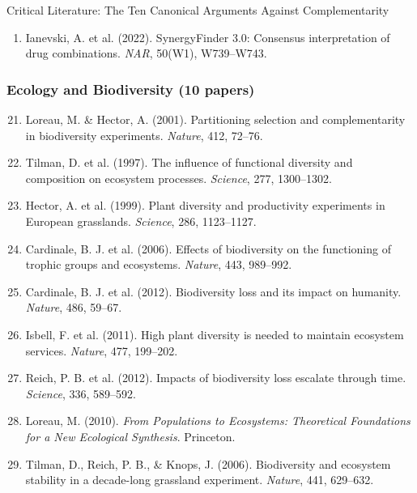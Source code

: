 \begin{chapter}{Critical Literature: The Ten Canonical Arguments Against Complementarity}
\begin{enumerate}
    \item Ianevski, A. et al. (2022). SynergyFinder 3.0: Consensus interpretation of drug combinations. \textit{NAR}, 50(W1), W739--W743.
\end{enumerate}

\subsubsection{Ecology and Biodiversity (10 papers)}

\begin{enumerate}
    \setcounter{enumi}{20}
    \item Loreau, M. \& Hector, A. (2001). Partitioning selection and complementarity in biodiversity experiments. \textit{Nature}, 412, 72--76.

    \item Tilman, D. et al. (1997). The influence of functional diversity and composition on ecosystem processes. \textit{Science}, 277, 1300--1302.

    \item Hector, A. et al. (1999). Plant diversity and productivity experiments in European grasslands. \textit{Science}, 286, 1123--1127.

    \item Cardinale, B. J. et al. (2006). Effects of biodiversity on the functioning of trophic groups and ecosystems. \textit{Nature}, 443, 989--992.

    \item Cardinale, B. J. et al. (2012). Biodiversity loss and its impact on humanity. \textit{Nature}, 486, 59--67.

    \item Isbell, F. et al. (2011). High plant diversity is needed to maintain ecosystem services. \textit{Nature}, 477, 199--202.

    \item Reich, P. B. et al. (2012). Impacts of biodiversity loss escalate through time. \textit{Science}, 336, 589--592.

    \item Loreau, M. (2010). \textit{From Populations to Ecosystems: Theoretical Foundations for a New Ecological Synthesis}. Princeton.

    \item Tilman, D., Reich, P. B., \& Knops, J. (2006). Biodiversity and ecosystem stability in a decade-long grassland experiment. \textit{Nature}, 441, 629--632.


\end{enumerate}
\end{chapter}
